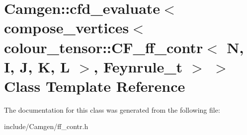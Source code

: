 \hypertarget{a00047}{}\section{Camgen\+:\+:cfd\+\_\+evaluate$<$ compose\+\_\+vertices$<$ colour\+\_\+tensor\+:\+:C\+F\+\_\+ff\+\_\+contr$<$ N, I, J, K, L $>$, Feynrule\+\_\+t $>$ $>$ Class Template Reference}
\label{a00047}


The documentation for this class was generated from the following file\+:\begin{DoxyCompactItemize}
\item 
include/\+Camgen/ff\+\_\+contr.\+h\end{DoxyCompactItemize}
